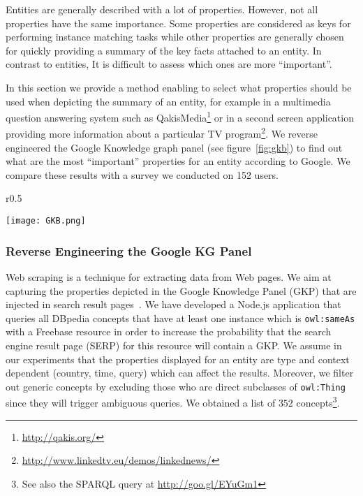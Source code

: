 Entities are generally described with a lot of properties. However, not all properties have the same importance. Some properties are considered as keys for performing instance matching tasks while other properties are generally chosen for quickly providing a summary of the key facts attached to an entity. In contrast to entities, It is difficult to assess which ones are more ``important''.

In this section we provide a method enabling to select what properties should be used when depicting the summary of an entity, for example in a multimedia question answering system such as QakisMedia\footnote{\url{http://qakis.org/}} or in a second screen application providing more information about a particular TV program\footnote{\url{http://www.linkedtv.eu/demos/linkednews/}}. We reverse engineered the Google Knowledge graph panel (see figure~\ref{fig:gkb}) to find out what are the most ``important'' properties for an entity according to Google. We compare these results with a survey we conducted on 152 users.

\begin{wrapfigure}{r}{0.5\textwidth}
  \begin{center}
    \texttt{[image: GKB.png]}
  \end{center}
  \caption{Google knowledge graph panel for the city of Nice, France}
  \label{fig:gkb}
\end{wrapfigure}

\subsubsection{Reverse Engineering the Google KG Panel}
\label{sec:knowledge-graph}

Web scraping is a technique for extracting data from Web pages. We aim at capturing the properties depicted in the Google Knowledge Panel (GKP) that are injected in search result pages~\cite{Bergman:GKG:12}. We have developed a Node.js application that queries all DBpedia concepts that have at least one instance which is \texttt{owl:sameAs} with a Freebase resource in order to increase the probability that the search engine result page (SERP) for this resource will contain a GKP. We assume in our experiments that the properties displayed for an entity are type and context dependent (country, time, query) which can affect the results. Moreover, we filter out generic concepts by excluding those who are direct subclasses of \texttt{owl:Thing} since they will trigger ambiguous queries. We obtained a list of $352$ concepts\footnote{See also the SPARQL query at \url{http://goo.gl/EYuGm1}}.

